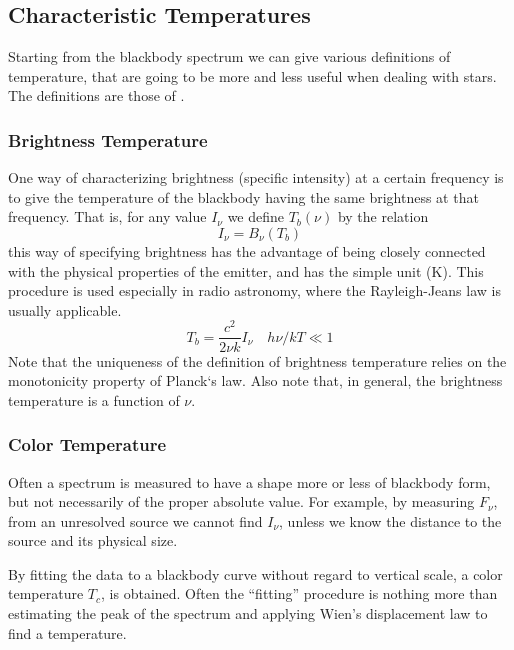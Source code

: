 \subsection*{Characteristic Temperatures}

Starting from the blackbody spectrum we can give various definitions of temperature, that are going to be more and less useful when dealing with stars. The definitions are those of \cite{1986rpa..book.....R}.

\subsubsection*{Brightness Temperature}

One way of characterizing brightness (specific intensity) at a certain frequency is to give the temperature of the blackbody having the same brightness at that frequency. That is, for any value $I_{\nu}$ we define $T_{b}(\nu)$ by the relation
\begin{equation*}
    I_{\nu} = B_{\nu}(T_{b})   
\end{equation*}
this way of specifying brightness has the advantage of being closely connected with the physical properties of the emitter, and has the simple unit (K). This procedure is used especially in radio astronomy, where the Rayleigh-Jeans law is usually applicable.
\begin{equation}
    T_{b} = \frac{c^{2}}{2\nu k}I_{\nu} \quad h\nu/kT \ll 1
    \label{eq:brightnesstemperature-RJ}
\end{equation}
Note that the uniqueness of the definition of brightness temperature relies on the monotonicity property of Planck‘s law. Also note that, in general, the brightness temperature is a function of $\nu$.

\subsubsection*{Color Temperature}

Often a spectrum is measured to have a shape more or less of blackbody form, but not necessarily of the proper absolute value. For example, by measuring $F_{\nu}$, from an unresolved source we cannot find $I_{\nu}$, unless we know the distance to the source and its physical size.
\par By fitting the data to a blackbody curve without regard to vertical scale, a color temperature $T_{c}$, is obtained. Often the “fitting” procedure is nothing more than estimating the peak of the spectrum and applying Wien’s displacement law to find a temperature.

